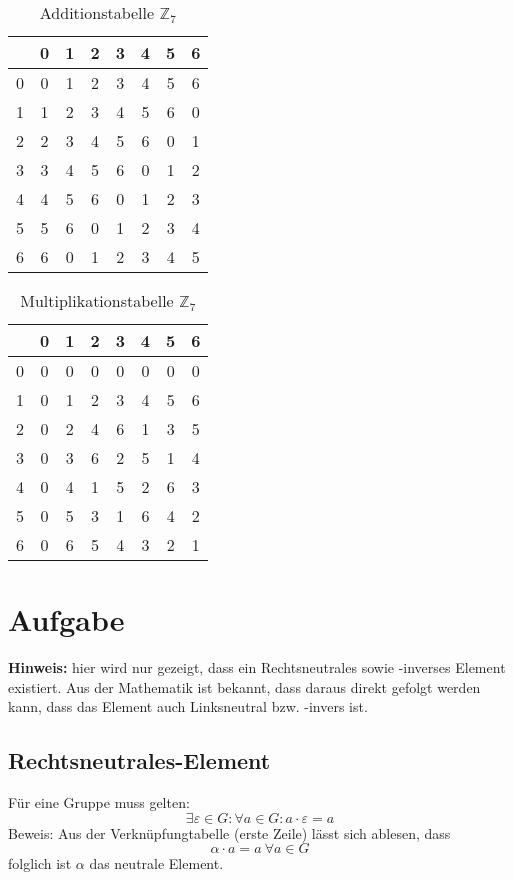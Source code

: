 \documentclass[DIN, pagenumber=false, fontsize=11pt, parskip=half]{scrartcl}
\begin{document}
    \begin{table}[H]
    \centering
    \begin{tabular}{c|ccccccc}
    \toprule
     & 0 & 1 & 2 & 3 & 4 & 5 & 6\\
    \midrule
    0 & 0 & 1 & 2 & 3 & 4 & 5 & 6\\
    1 & 1 & 2 & 3 & 4 & 5 & 6 & 0\\
    2 & 2 & 3 & 4 & 5 & 6 & 0 & 1\\
    3 & 3 & 4 & 5 & 6 & 0 & 1 & 2\\
    4 & 4 & 5 & 6 & 0 & 1 & 2 & 3\\
    5 & 5 & 6 & 0 & 1 & 2 & 3 & 4\\
    6 & 6 & 0 & 1 & 2 & 3 & 4 & 5\\
    \bottomrule
    \end{tabular}
    \caption{Additionstabelle $\mathbb{Z}_7$}
    \end{table}

    \begin{table}[H]
    \centering
    \begin{tabular}{c|ccccccc}
    \toprule
     & 0 & 1 & 2 & 3 & 4 & 5 & 6\\
    \midrule
    0 & 0 & 0 & 0 & 0 & 0 & 0 & 0\\
    1 & 0 & 1 & 2 & 3 & 4 & 5 & 6\\
    2 & 0 & 2 & 4 & 6 & 1 & 3 & 5\\
    3 & 0 & 3 & 6 & 2 & 5 & 1 & 4\\
    4 & 0 & 4 & 1 & 5 & 2 & 6 & 3\\
    5 & 0 & 5 & 3 & 1 & 6 & 4 & 2\\
    6 & 0 & 6 & 5 & 4 & 3 & 2 & 1\\
    \bottomrule
    \end{tabular}
    \caption{Multiplikationstabelle $\mathbb{Z}_7$}
    \end{table}

    \section{Aufgabe}
    \textbf{Hinweis:} hier wird nur gezeigt, dass ein Rechtsneutrales sowie -inverses
    Element existiert. Aus der Mathematik ist bekannt, dass daraus direkt gefolgt werden
    kann, dass das Element auch Linksneutral bzw. -invers ist.

    \subsection{Rechtsneutrales-Element}
    Für eine Gruppe muss gelten:
    \begin{equation}
        \exists \varepsilon \in G: \forall a \in G: a \cdot \varepsilon = a
    \end{equation}
    Beweis: Aus der Verknüpfungtabelle (erste Zeile) lässt sich ablesen, dass
    \begin{equation}
        \alpha \cdot a = a\ \forall a \in G
    \end{equation}
    folglich ist $\alpha$ das neutrale Element.
\end{document}
